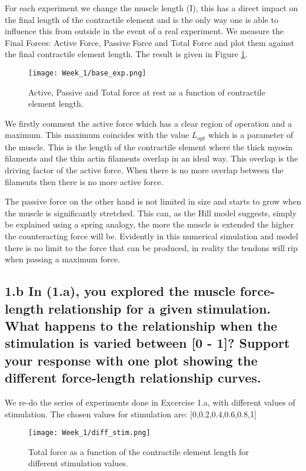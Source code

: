 \documentclass[11pt]{article}
\begin{document}
For each experiment we change the muscle length (I), this has a direct impact on the final length of the contractile element and is the only way one is able to influence this from outside in the event of a real experiment. We measure the Final Forces: Active Force, Passive Force and Total Force and plot them against the final contractile element length. The result is given in Figure \ref{fig:baseexp}. 

\begin{figure}[!h]
\centering
\texttt{[image: Week\_1/base\_exp.png]}

\caption{Active, Passive and Total force at rest as a function of contractile element length.}
\label{fig:baseexp}
\end{figure}

We firstly comment the active force which has a clear region of operation and a maximum. This maximum coincides with the value \(L_{opt}\) which is a parameter of the muscle. This is the length of the contractile element where the thick myosin filaments and the thin actin filaments overlap in an ideal way. This overlap is the driving factor of the active force. When there is no more overlap between the filaments then there is no more active force.

The passive force on the other hand is not limited in size and starts to grow when the muscle is significantly stretched. This can, as the Hill model suggests, simply be explained using a spring analogy, the more the muscle is extended the higher the counteracting force will be. Evidently in this numerical simulation and model there is no limit to the force that can be produced, in reality the tendons will rip when passing a maximum force. 
\newpage 
\subsection*{1.b In (1.a), you explored the muscle force-length
  relationship for a given stimulation. What happens to the
  relationship when the stimulation is varied between [0 - 1]? Support
  your response with one plot showing the different force-length
  relationship curves.}
We re-do the series of experiments done in Excercise 1.a, with different values of stimulation. The chosen values for stimulation are: [0,0.2,0.4,0.6,0.8,1]

\begin{figure}[!h]
\texttt{[image: Week\_1/diff\_stim.png]}
\centering
\caption{Total force as a function of the contractile element length for different stimulation values.}
\label{fig:stims}
\end{figure}
\end{document}
